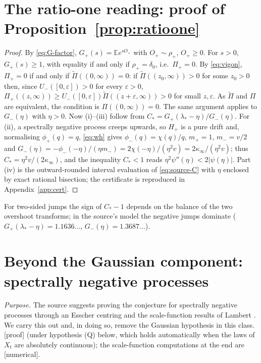 \documentclass[11pt,a4paper]{article}
\theoremstyle{definition}
\theoremstyle{remark}
\newcommand{\E}{\mathbb E}
\newcommand{\1}{\mathbf 1}
\newcommand{\kinf}{\kappa_\infty}
\newcommand{\status}[1]{\textsf{[#1]}}
\begin{document}
\section{The ratio-one reading: proof of Proposition~\ref{prop:ratioone}}\label{sec:ratioone-proof}
\begin{proof}
By \eqref{eq:G-factor}, $G_+(s)=\E e^{sO_+}$ with $O_+\sim\rho_+$, $O_+\ge0$. For $s>0$, $G_+(s)\ge1$, with equality if and only if $\rho_+=\delta_0$, i.e.\ $\Pi_+=0$. By \eqref{eq:vigon}, $\Pi_+=0$ if and only if $\widetilde\Pi((0,\infty))=0$: if $\widetilde\Pi((z_0,\infty))>0$ for some $z_0>0$ then, since $U_-([0,\varepsilon])>0$ for every $\varepsilon>0$, $\Pi_+((z,\infty))\ge U_-([0,\varepsilon])\widetilde\Pi((z+\varepsilon,\infty))>0$ for small $z,\varepsilon$. As $\widetilde\Pi$ and $\Pi$ are equivalent, the condition is $\Pi((0,\infty))=0$. The same argument applies to $G_-(\eta)$ with $\eta>0$. Now (i)--(iii) follow from $C_*=G_+(\lambda_*-\eta)/G_-(\eta)$. For (ii), a spectrally negative process creeps upwards, so $H_+$ is a pure drift and, normalising $\phi_+(q)=q$, \eqref{eq:wh} gives $\phi_-(q)=\chi(q)/q$, $m_+=1$, $m_-=v/2$ and $G_-(\eta)=-\phi_-(-\eta)/(\eta m_-)=2\chi(-\eta)/(\eta^2v)=2\kinf/(\eta^2v)$; thus $C_*=\eta^2v/(2\kinf)$, and the inequality $C_*<1$ reads $\eta^2\psi''(\eta)<2|\psi(\eta)|$. Part (iv) is the outward-rounded interval evaluation of \eqref{eq:source-C} with $\eta$ enclosed by exact rational bisection; the certificate is reproduced in Appendix~\ref{app:cert}.
\end{proof}
For two-sided jumps the sign of $C_*-1$ depends on the balance of the two overshoot transforms; in the source's model the negative jumps dominate ($G_+(\lambda_*-\eta)=1.1636\ldots$, $G_-(\eta)=1.3687\ldots$).
\section{Beyond the Gaussian component: spectrally negative processes}\label{sec:sn}
\emph{Purpose.} The source suggests proving the conjecture for spectrally negative processes through an Esscher centring and the scale-function results of Lambert \cite{lambert}. We carry this out and, in doing so, remove the Gaussian hypothesis in this class. \status{proof} (under hypothesis (Q) below, which holds automatically when the laws of $X_t$ are absolutely continuous); the scale-function computations at the end are \status{numerical}.
\end{document}
